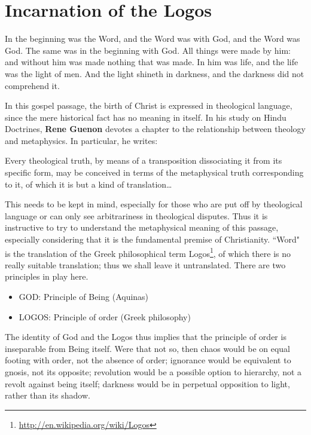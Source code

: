 \section{Incarnation of the Logos}

\begin{quotex}
In the beginning was the Word, and the Word was with God, and the Word was God. The same was in the beginning with God. All things were made by him: and without him was made nothing that was made. In him was life, and the life was the light of men. And the light shineth in darkness, and the darkness did not comprehend it. 

\end{quotex}
In this gospel passage, the birth of Christ is expressed in theological language, since the mere historical fact has no meaning in itself. In his study on Hindu Doctrines, \textbf{Rene Guenon} devotes a chapter to the relationship between theology and metaphysics. In particular, he writes:

\begin{quotex}
Every theological truth, by means of a transposition dissociating it from its specific form, may be conceived in terms of the metaphysical truth corresponding to it, of which it is but a kind of translation…

\end{quotex}
This needs to be kept in mind, especially for those who are put off by theological language or can only see arbitrariness in theological disputes. Thus it is instructive to try to understand the metaphysical meaning of this passage, especially considering that it is the fundamental premise of Christianity. ``Word" is the translation of the Greek philosophical term Logos\footnote{\url{http://en.wikipedia.org/wiki/Logos}}, of which there is no really suitable translation; thus we shall leave it untranslated. There are two principles in play here.

\begin{itemize}
\item GOD: Principle of Being (Aquinas) 
\item LOGOS: Principle of order (Greek philosophy) 
\end{itemize}
The identity of God and the Logos thus implies that the principle of order is inseparable from Being itself. Were that not so, then chaos would be on equal footing with order, not the absence of order; ignorance would be equivalent to gnosis, not its opposite; revolution would be a possible option to hierarchy, not a revolt against being itself; darkness would be in perpetual opposition to light, rather than its shadow.



